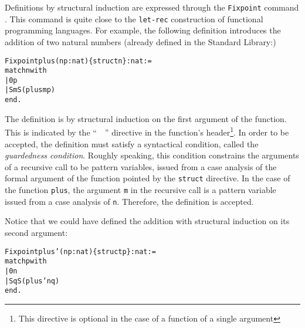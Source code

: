 \documentclass[11pt]{article}
\newcommand{\refmancite}[1]{{}}
\begin{document}
Definitions by structural induction are expressed through the
\texttt{Fixpoint} command \refmancite{Section
\ref{Fixpoint}}. This command is quite close to the
\texttt{let-rec} construction of functional programming languages.
For example, the following definition introduces the addition of two
natural numbers (already defined in the Standard Library:)

\begin{alltt} 
Fixpoint plus (n p:nat) \{struct n\} : nat :=
  match n with
          | 0 {\funarrow} p
          | S m {\funarrow} S (plus m p)
 end.
\end{alltt}

The definition is by structural induction on the first argument of the
function. This is indicated  by the ``~~''
directive in the function's header\footnote{This directive is optional
in the case of a function of a single argument}.
  In
order to be accepted, the definition must satisfy a syntactical
condition, called the \textsl{guardedness condition}. Roughly
speaking, this condition constrains the arguments of a recursive call
to be pattern variables, issued from a case analysis of the formal
argument of the function pointed by the \texttt{struct} directive.
 In the case of the
function \texttt{plus}, the argument \texttt{m} in the recursive call is a
pattern variable issued from a case analysis of \texttt{n}. Therefore, the
definition is accepted.

Notice that we could have defined the addition with structural induction 
on its second argument:
\begin{alltt} 
Fixpoint plus' (n p:nat) \{struct p\} : nat :=
    match p with
          | 0 {\funarrow} n
          | S q {\funarrow} S (plus' n q)
    end.
\end{alltt}


\end{document}
